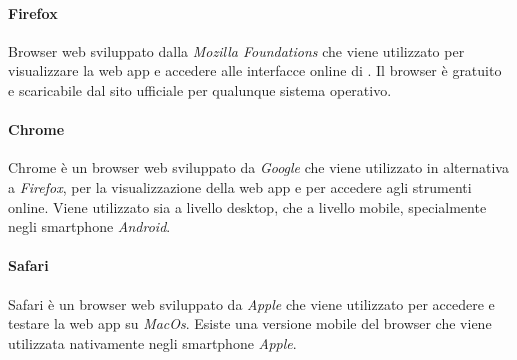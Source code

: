 				\paragraph{Firefox} 
					Browser web sviluppato dalla \textit{Mozilla Foundations} che viene utilizzato per visualizzare la web app e accedere alle interfacce online di .
					\newline
					Il browser è gratuito e scaricabile dal sito ufficiale per qualunque sistema operativo.

				\paragraph{Chrome} 
					Chrome è un browser web sviluppato da \textit{Google} che viene utilizzato in alternativa a \textit{Firefox}, per la visualizzazione della web app e per accedere agli strumenti online.
					\newline
					Viene utilizzato sia a livello desktop, che a livello mobile, specialmente negli smartphone \textit{Android}.

				\paragraph{Safari} 
					Safari è un browser web sviluppato da \textit{Apple} che viene utilizzato per accedere e testare la web app su \textit{MacOs}.
					\newline
					Esiste una versione mobile del browser che viene utilizzata nativamente negli smartphone \textit{Apple}.
